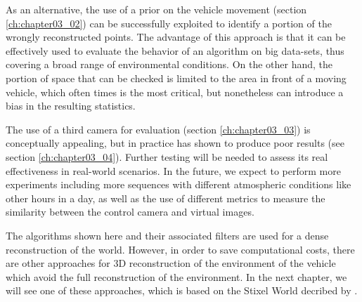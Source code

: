 As an alternative, the use of a prior on the vehicle movement (section \ref{ch:chapter03_02}) can be successfully exploited to identify a portion of the wrongly reconstructed points. The advantage of this approach is that it can be effectively used to evaluate the behavior of an algorithm on big data-sets, thus covering a broad range of environmental conditions. On the other hand, the portion of space that can be checked is limited to the area in front of a moving vehicle, which often times is the most critical, but nonetheless can introduce a bias in the resulting statistics.

The use of a third camera for evaluation (section \ref{ch:chapter03_03}) is conceptually appealing, but in practice has shown to produce poor results (see section \ref{ch:chapter03_04}). Further testing will be needed to assess its real effectiveness in real-world scenarios. In the future, we expect to perform more experiments including more sequences with different atmospheric conditions like other hours in a day, as well as the use of different metrics to measure the similarity between the control camera and virtual images.

The algorithms shown here and their associated filters are used for a dense reconstruction of the world. However, in order to save computational costs, there are other approaches for 3D reconstruction of the environment of the vehicle which avoid the full reconstruction of the environment. In the next chapter, we will see one of these approaches, which is based on the Stixel World decribed by \cite{badino2009stixel}.
